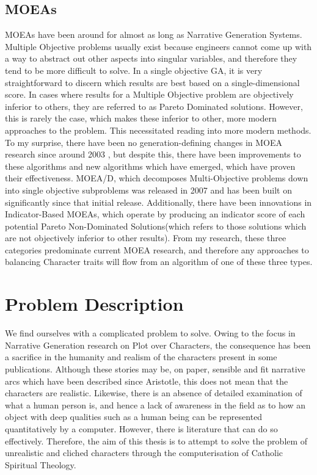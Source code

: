 \documentclass[12pt]{article}
\begin{document}
\subsection{MOEAs}
MOEAs have been around for almost as long as Narrative Generation Systems. Multiple Objective problems usually exist because engineers cannot come up with a way to abstract out other aspects into singular variables, and therefore they tend to be more difficult to solve. In a single objective GA, it is very straightforward to discern which results are best based on a single-dimensional score. In cases where results for a Multiple Objective problem are objectively inferior to others, they are referred to as Pareto Dominated solutions. However, this is rarely the case, which makes these inferior to other, more modern approaches to the problem\cite{AchievementScalarazingIndicatorBased}. This necessitated reading into more modern methods. To my surprise, there have been no generation-defining changes in MOEA research since around 2003 \cite{MOEASurvey1}, but despite this, there have been improvements to these algorithms and new algorithms which have emerged, which have proven their effectiveness. MOEA/D, which decomposes Multi-Objective problems down into single objective subproblems \cite{MOEAD} was released in 2007 and has been built on significantly since that initial release. Additionally, there have been innovations in Indicator-Based MOEAs, which operate by producing an indicator score of each potential Pareto Non-Dominated Solutions(which refers to those solutions which are not objectively inferior to other results). From my research, these three categories predominate current MOEA research, and therefore any approaches to balancing Character traits will flow from an algorithm of one of these three types.

\section{Problem Description}
We find ourselves with a complicated problem to solve. Owing to the focus in Narrative Generation research on Plot over Characters, the consequence has been a sacrifice in the humanity and realism of the characters present in some publications. Although these stories may be, on paper, sensible and fit narrative arcs which have been described since Aristotle, this does not mean that the characters are realistic. Likewise, there is an absence of detailed examination of what a human person is, and hence a lack of awareness in the field as to how an object with deep qualities such as a human being can be represented quantitatively by a computer. However, there is literature that can do so effectively. Therefore, the aim of this thesis is to attempt to solve the problem of unrealistic and cliched characters through the computerisation of Catholic Spiritual Theology. \\
\end{document}
